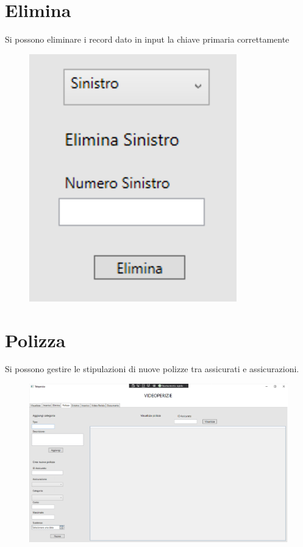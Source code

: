 \documentclass[a4paper,12pt]{report}
\begin{document}
\section{Elimina}
Si possono eliminare i record dato in input la chiave primaria correttamente

\begin{figure}[ht]
    \begin{center}
        \centering
        \includegraphics[scale=1]{img/Applicazione/Elimina.png}
    \end{center}
\end{figure}

\clearpage
\section{Polizza}
Si possono gestire le stipulazioni di nuove polizze tra assicurati e assicurazioni.

\begin{figure}[ht]
    \begin{center}
        \centering
        \includegraphics[width=\textwidth]{img/Applicazione/Polizza.png}
    \end{center}
\end{figure}
\clearpage
\end{document}
